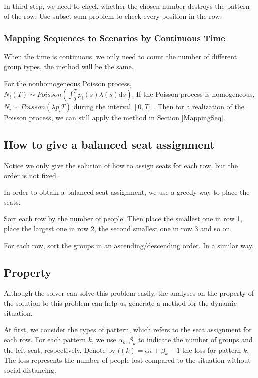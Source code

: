 In third step, we need to check whether the chosen number destroys the pattern of the row. Use subset sum problem to check every position in the row.

\subsubsection{Mapping Sequences to Scenarios by Continuous Time}

When the time is continuous, we only need to count the number of different group types, the method will be the same.

For the nonhomogeneous Poisson process, $N_{i}(T) \sim Poisson (\int_0^{T} p_i(s)\lambda(s) \mathrm{d} s)$. If the Poisson process is homogeneous, $N_{i} \sim Poisson(\lambda p_i T)$ during the interval $[0, T]$. Then for a realization of the Poisson process, we can still apply the method in Section \ref{MappingSeq}.


\subsection{How to give a balanced seat assignment}

Notice we only give the solution of how to assign seats for each row, but the order is not fixed.

In order to obtain a balanced seat assignment, we use a greedy way to place the seats.

Sort each row by the number of people. Then place the smallest one in row 1, place the largest one in row 2, the second smallest one in row 3 and so on. 

For each row, sort the groups in an ascending/descending order. In a similar way.


\subsection{Property}
Although the solver can solve this problem easily, the analyses on the property of the solution to this problem can help us generate a method for the dynamic situation. 

At first, we consider the types of pattern, which refers to the seat assignment for each row. For each pattern $k$, we use $\alpha_k, \beta_k$ to indicate the number of groups and the left seat, respectively. Denote by $l(k) = \alpha_k + \beta_k -1$ the loss for pattern $k$. The loss represents the number of people lost compared to the situation without social distancing.

